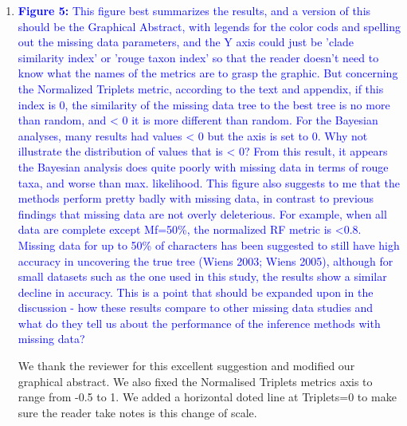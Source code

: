 \documentclass[12pt,letterpaper]{article}
\begin{document}
\begin{enumerate}
\item{\textcolor{blue}{\textbf{Figure 5:} This figure best summarizes the results, and a version of this should be the Graphical Abstract, with legends for the color cods and spelling out the missing data parameters, and the Y axis could just be 'clade similarity index' or 'rouge taxon index' so that the reader doesn't need to know what the names of the metrics are to grasp the graphic.
But concerning the Normalized Triplets metric, according to the text and appendix, if this index is 0, the similarity of the missing data tree to the best tree is no more than random, and < 0 it is more different than random.
For the Bayesian analyses, many results had values < 0 but the axis is set to 0.
Why not illustrate the distribution of values that is < 0? %
From this result, it appears the Bayesian analysis does quite poorly with missing data in terms of rouge taxa, and worse than max. likelihood.
This figure also suggests to me that the methods perform pretty badly with missing data, in contrast to previous findings that missing data are not overly deleterious.
For example, when all data are complete except Mf=50\%, the normalized RF metric is <0.8. Missing data for up to 50\% of characters has been suggested to still have high accuracy in uncovering the true tree (Wiens 2003; Wiens 2005), although for small datasets such as the one used in this study, the results show a similar decline in accuracy.
This is a point that should be expanded upon in the discussion - how these results compare to other missing data studies and what do they tell us about the performance of the inference methods with missing data?}}

We thank the reviewer for this excellent suggestion and modified our graphical abstract. We also fixed the Normalised Triplets metrics axis to range from -0.5 to 1. We added a horizontal doted line at Triplets=0 to make sure the reader take notes is this change of scale.



\end{enumerate}
\end{document}
